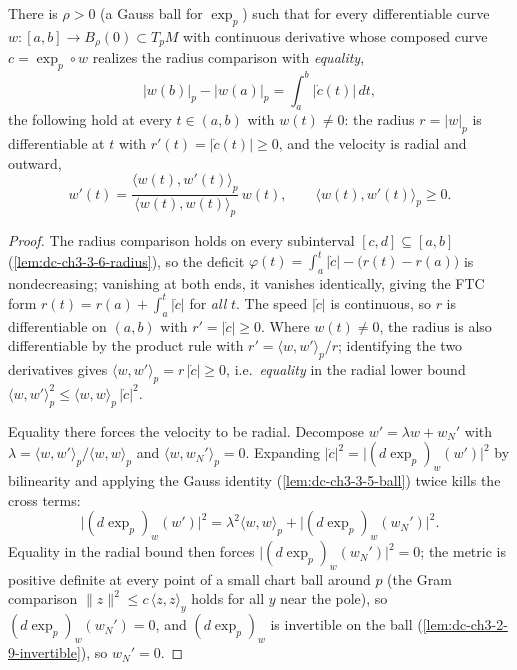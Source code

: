 \begin{lemma}
  \label{lem:dc-ch3-3-6-equality-radial}
  \leanok
  There is $\rho>0$ (a Gauss ball for $\exp_p$) such that for every
  differentiable curve $w:[a,b]\to B_\rho(0)\subset T_pM$ with continuous
  derivative whose composed curve $c=\exp_p\circ w$ realizes the radius
  comparison with \emph{equality},
  $$|w(b)|_p-|w(a)|_p=\int_a^b|\dot c(t)|\,dt,$$
  the following hold at every $t\in(a,b)$ with $w(t)\neq0$: the radius
  $r=|w|_p$ is differentiable at $t$ with $r'(t)=|\dot c(t)|\ge0$, and the
  velocity is radial and outward,
  $$w'(t)=\frac{\langle w(t),w'(t)\rangle_p}{\langle w(t),w(t)\rangle_p}\,
    w(t),\qquad\langle w(t),w'(t)\rangle_p\ge0.$$
\end{lemma}
\begin{proof}
  \sketch
  \leanok
  The radius comparison holds on every subinterval $[c,d]\subseteq[a,b]$
  (\cref{lem:dc-ch3-3-6-radius}), so the deficit
  $\varphi(t)=\int_a^t|\dot c|-\big(r(t)-r(a)\big)$ is nondecreasing;
  vanishing at both ends, it vanishes identically, giving the FTC form
  $r(t)=r(a)+\int_a^t|\dot c|$ for \emph{all} $t$. The speed $|\dot c|$ is
  continuous, so $r$ is differentiable on $(a,b)$ with $r'=|\dot c|\ge0$.
  Where $w(t)\neq0$, the radius is also differentiable by the product rule
  with $r'=\langle w,w'\rangle_p/r$; identifying the two derivatives gives
  $\langle w,w'\rangle_p=r\,|\dot c|\ge0$, i.e.\ \emph{equality} in the
  radial lower bound
  $\langle w,w'\rangle_p^2\le\langle w,w\rangle_p\,|\dot c|^2$.

  Equality there forces the velocity to be radial. Decompose
  $w'=\lambda w+w_N'$ with
  $\lambda=\langle w,w'\rangle_p/\langle w,w\rangle_p$ and
  $\langle w,w_N'\rangle_p=0$. Expanding
  $|\dot c|^2=\big|(d\exp_p)_w(w')\big|^2$ by bilinearity and applying the
  Gauss identity (\cref{lem:dc-ch3-3-5-ball}) twice kills the cross terms:
  $$\big|(d\exp_p)_w(w')\big|^2
    =\lambda^2\langle w,w\rangle_p+\big|(d\exp_p)_w(w_N')\big|^2.$$
  Equality in the radial bound then forces
  $\big|(d\exp_p)_w(w_N')\big|^2=0$; the metric is positive definite at
  every point of a small chart ball around $p$ (the Gram comparison
  $\|z\|^2\le c\,\langle z,z\rangle_y$ holds for all $y$ near the pole), so
  $(d\exp_p)_w(w_N')=0$, and $(d\exp_p)_w$ is invertible on the ball
  (\cref{lem:dc-ch3-2-9-invertible}), so $w_N'=0$.
\end{proof}

